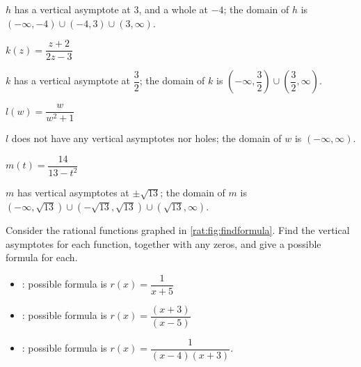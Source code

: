 \begin{exercises}
\begin{problem}
\begin{multicols}{3}
\begin{subproblem}
\begin{shortsolution}
				 $h$ has a vertical asymptote at $3$, and a whole at $-4$; the domain of $h$ is $(-\infty,-4)\cup(-4,3)\cup(3,\infty)$.
			 \end{shortsolution}
		 \end{subproblem}
		 \begin{subproblem}
			 $k(z)=\dfrac{z+2}{2z-3}$
			 \begin{shortsolution}
				 $k$ has a vertical asymptote at $\dfrac{3}{2}$; the domain of $k$ is $\left( -\infty,\dfrac{3}{2} \right)\cup\left( \dfrac{3}{2},\infty \right)$.
			 \end{shortsolution}
		 \end{subproblem}
		 \begin{subproblem}
			 $l(w)=\dfrac{w}{w^2+1}$
			 \begin{shortsolution}
				 $l$ does not have any vertical asymptotes nor holes; the domain of $w$ is $(-\infty,\infty)$.
			 \end{shortsolution}
		 \end{subproblem}
		 \begin{subproblem}
			 $m(t)=\dfrac{14}{13-t^2}$
			 \begin{shortsolution}
				 $m$ has vertical asymptotes at $\pm\sqrt{13}$; the domain of $m$ is $(-\infty,\sqrt{13})\cup(-\sqrt{13},\sqrt{13})\cup(\sqrt{13},\infty)$.
			 \end{shortsolution}
		 \end{subproblem}
	 \end{multicols}
	 \end{problem}

	 \begin{problem}
	 Consider the rational functions graphed in \cref{rat:fig:findformula}. Find
	 the vertical asymptotes for each function, together with any zeros, and
	 give a possible formula for each.
	 \begin{shortsolution}
		 \begin{itemize}
			 \item {}: possible formula is $r(x)=\dfrac{1}{x+5}$
			 \item {}: possible formula is $r(x)=\dfrac{(x+3)}{(x-5)}$
			 \item {}: possible formula is $r(x)=\dfrac{1}{(x-4)(x+3)}$.
		 \end{itemize}
	 \end{shortsolution}
	 \end{problem}


\end{exercises}
